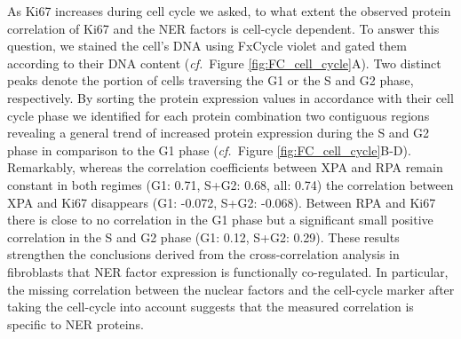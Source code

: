 As Ki67 increases during cell cycle we asked, to what extent the observed protein correlation of Ki67 and the NER factors is cell-cycle dependent. To answer this question, we stained the cell's DNA using FxCycle violet and gated them according to their DNA content (\textit{cf.}\ Figure \ref{fig:FC_cell_cycle}A). Two distinct peaks denote the portion of cells traversing the G1 or the S and G2 phase, respectively. By sorting the protein expression values in accordance with their cell cycle phase we identified for each protein combination two contiguous regions revealing a general trend of increased protein expression during the S and G2 phase in comparison to the G1 phase (\textit{cf.}\ Figure \ref{fig:FC_cell_cycle}B-D).\\
Remarkably, whereas the correlation coefficients between XPA and RPA remain constant in both regimes (G1: 0.71, S+G2: 0.68, all: 0.74) the correlation between XPA and Ki67 disappears (G1: -0.072, S+G2: -0.068). Between RPA and Ki67 there is close to no correlation in the G1 phase but a significant small positive correlation in the S and G2 phase (G1: 0.12, S+G2: 0.29). These results strengthen the conclusions derived from the cross-correlation analysis in fibroblasts that NER factor expression is functionally co-regulated. In particular, the missing correlation between the nuclear factors and the cell-cycle marker after taking the cell-cycle into account suggests that the measured correlation is specific to NER proteins. 





